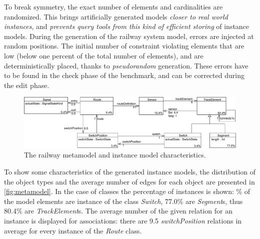 To break symmetry, the exact number of elements and cardinalities are randomized. This brings artificially generated models \emph{closer to real world instances}, and \emph{prevents query tools from this kind of efficient storing} of instance models. During the generation of the railway system model, errors are injected at random positions. The initial number of constraint violating elements that are low (below one percent of the total number of elements), and are deterministically placed, thanks to \emph{pseudorandom} generation. These errors have to be found in the check phase of the benchmark, and can be corrected during the edit phase.

\begin{figure}[htb]
\begin{center}
\includegraphics[width=\textwidth]{figures/instance/TrainMMb.pdf}
\caption{The railway metamodel and instance model characteristics.}
\label{fig:metamodel-instance-characteristics}
\end{center}
\end{figure}

To show some characteristics of the generated instance models, the distribution of the object types and the average number of edges for each object are presented in \autoref{fig:metamodel}. In the case of classes the percentage of instances is shown: \% of the model elements are instance of the class \emph{Switch}, 77.0\% are \emph{Segment}s, thus 80.4\% are \emph{TrackElement}s. The average number of the given relation for an instance is displayed for associations: \eg there are 9.5 \emph{switchPosition} relations in average for every instance of the \emph{Route} class.
